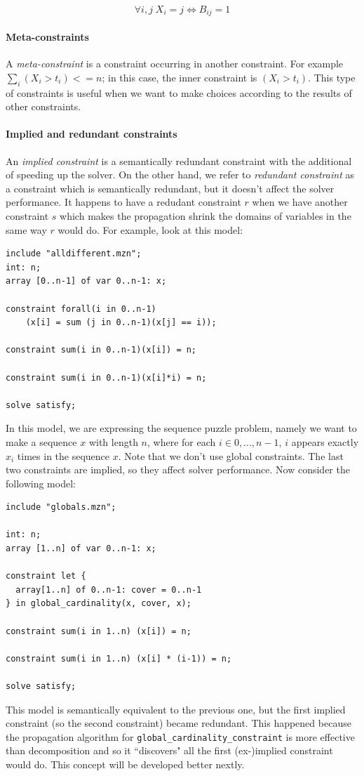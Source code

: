 \documentclass[10pt,a4paper]{article}
\begin{document}
\[ \forall i, j \; X_i = j \iff B_{ij} = 1 \]

\paragraph{Meta-constraints}
A \textit{meta-constraint} is a constraint occurring in another constraint. For
example $ \sum_{i} (X_i > t_i) <= n $; in this case, the inner constraint is
$ (X_i > t_i) $. This type of constraints is useful when we want to make choices
according to the results of other constraints.

\paragraph{Implied and redundant constraints}
An \textit{implied constraint} is a semantically redundant constraint with the
additional of speeding up the solver. On the other hand, we refer to
\textit{redundant constraint} as a constraint which is semantically redundant,
but it doesn't affect the solver performance. It happens to have a redudant
constraint $r$ when we have another constraint $s$ which makes the propagation
shrink the domains of variables in the same way $r$ would do. For example, look
at this model:

\begin{lstlisting}[style=none]
include "alldifferent.mzn";
int: n;
array [0..n-1] of var 0..n-1: x;

constraint forall(i in 0..n-1)
    (x[i] = sum (j in 0..n-1)(x[j] == i));

constraint sum(i in 0..n-1)(x[i]) = n;

constraint sum(i in 0..n-1)(x[i]*i) = n;

solve satisfy;
\end{lstlisting}

In this model, we are expressing the sequence puzzle problem, namely we want to
make a sequence $x$ with length $n$, where for each $i \in {0, ..., n-1}$, $i$
appears exactly $x_i$ times in the sequence $x$. Note that we don't use global
constraints. The last two constraints are implied, so they affect solver
performance. Now consider the following model:

\begin{lstlisting}[style=none]
include "globals.mzn";

int: n;
array [1..n] of var 0..n-1: x;

constraint let {
  array[1..n] of 0..n-1: cover = 0..n-1
} in global_cardinality(x, cover, x);

constraint sum(i in 1..n) (x[i]) = n;

constraint sum(i in 1..n) (x[i] * (i-1)) = n;

solve satisfy;
\end{lstlisting}
This model is semantically equivalent to the previous one, but the first implied
constraint (so the second constraint) became redundant. This happened because
the propagation algorithm for \texttt{global\_cardinality\_constraint} is more
effective than decomposition and so it ``discovers" all the first (ex-)implied
constraint would do. This concept will be developed better nextly.
\end{document}
